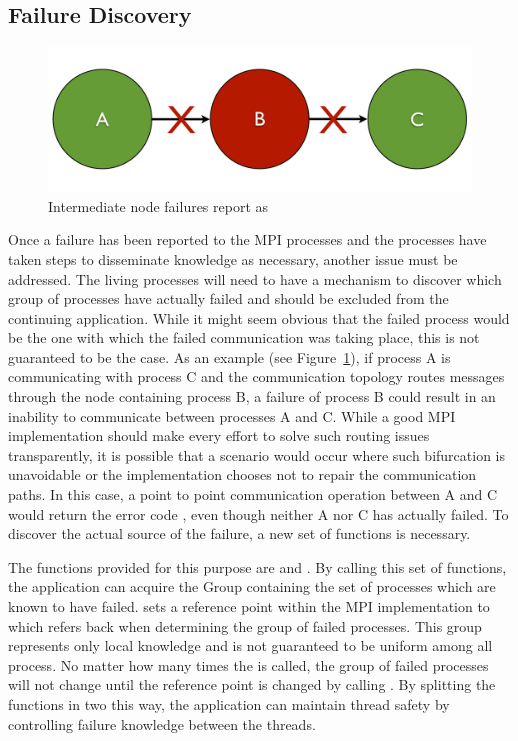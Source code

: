 \subsection{Failure Discovery}\label{subsec:ulfm:discovery}

\begin{figure}[t]
    \centering
    \includegraphics[width=\linewidth]{figures/intermediate-failure}
    \caption{Intermediate node failures report as
             }
    \label{fig:ulfm:intermediate-failure}
\end{figure}

Once a failure has been reported to the MPI processes and the processes have
taken steps to disseminate knowledge as necessary, another issue must be
addressed. The living processes will need to have a mechanism to discover
which group of processes have actually failed and should be excluded from the
continuing application. While it might seem obvious that the failed process
would be the one with which the failed communication was taking place, this is
not guaranteed to be the case. As an example (see
Figure~\ref{fig:ulfm:intermediate-failure}), if process A is communicating with
process C and the communication topology routes messages through the node
containing process B, a failure of process B could result in an inability to
communicate between processes A and C. While a good MPI implementation should
make every effort to solve such routing issues transparently, it is possible
that a scenario would occur where such bifurcation is unavoidable or the
implementation chooses not to repair the communication paths. In this case, a
point to point communication operation between A and C would return the error
code , even though neither A nor C has actually
failed. To discover the actual source of the failure, a new set of functions is
necessary.

The functions provided for this purpose are 
and . By calling this set of functions,
the application can acquire the \mpi Group containing the set of
processes which are known to have failed.  sets
a reference point within the MPI implementation to which
 refers back when determining the group
of failed processes. This group represents only local knowledge and is not
guaranteed to be uniform among all process. No matter how many times the
 is called, the group of failed
processes will not change until the reference point is changed by calling
. By splitting the functions in two this way,
the application can maintain thread safety by controlling failure knowledge 
between the threads.

